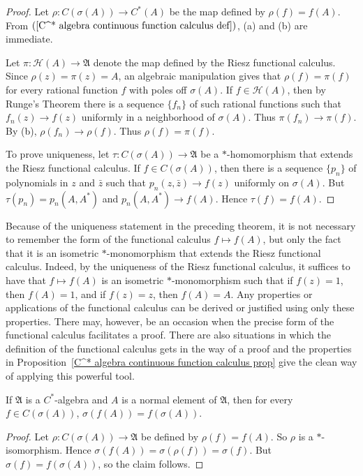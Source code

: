 \begin{proof}
Let $\rho:C(\sigma(A))\to C^*(A)$ be the map defined by $\rho(f)=f(A)$. From $(\ref{C^* algebra continuous function calculus def})$, (a) and (b) are immediate.\par
Let $\pi:\mathcal{H}(A)\to\mathfrak{A}$ denote the map defined by the Riesz functional calculus. Since $\rho(z)=\pi(z)=A$, an algebraic manipulation gives that $\rho(f)=\pi(f)$ for every rational function $f$ with poles off $\sigma(A)$. If $f\in\mathcal{H}(A)$, then by Runge's Theorem there is a sequence $\{f_n\}$ of such rational functions such that $f_n(z)\to f(z)$ uniformly in a neighborhood of $\sigma(A)$. Thus $\pi(f_n)\to\pi(f)$. By (b), $\rho(f_n)\to\rho(f)$. Thus $\rho(f)=\pi(f)$.\par
To prove uniqueness, let $\tau:C(\sigma(A))\to\mathfrak{A}$ be a $*$-homomorphism that extends the Riesz functional calculus. If $f\in C(\sigma(A))$, then there is a sequence $\{p_n\}$ of polynomials in $z$ and $\bar{z}$ such that $p_n(z,\bar{z})\to f(z)$ uniformly on $\sigma(A)$. But $\tau(p_n)=p_n(A,A^*)$ and $p_n(A,A^*)\to f(A)$. Hence $\tau(f)=f(A)$.
\end{proof}
Because of the uniqueness statement in the preceding theorem, it is not necessary to remember the form of the functional calculus $f\mapsto f(A)$, but only the fact that it is an isometric $*$-monomorphism that extends the Riesz functional calculus. Indeed, by the uniqueness of the Riesz functional calculus, it suffices to have that $f\mapsto f(A)$ is an isometric $*$-monomorphism such that if $f(z)=1$, then $f(A)=1$, and if $f(z)=z$, then $f(A)=A$. Any properties or applications of the functional calculus can be derived or justified using only these properties. There may, however, be an occasion when the precise form of the functional calculus facilitates a proof. There are also situations in which the definition of the functional calculus gets in the way of a proof and the properties in Proposition~\ref{C^* algebra continuous function calculus prop} give the clean way of applying this powerful tool.
\begin{proposition}
If $\mathfrak{A}$ is a $C^*$-algebra and $A$ is a normal element of $\mathfrak{A}$, then for every $f\in C(\sigma(A))$, $\sigma(f(A))=f(\sigma(A))$.
\end{proposition}
\begin{proof}
Let $\rho:C(\sigma(A))\to\mathfrak{A}$ be defined by $\rho(f)=f(A)$. So $\rho$ is a $*$-isomorphism. Hence $\sigma(f(A))=\sigma(\rho(f))=\sigma(f)$. But $\sigma(f)=f(\sigma(A))$, so the claim follows.
\end{proof}
